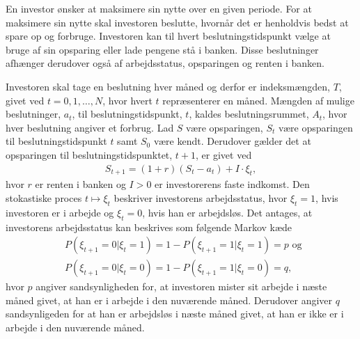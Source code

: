 En investor ønsker at maksimere sin nytte over en given periode. For at maksimere sin nytte skal investoren beslutte, hvornår det er henholdvis bedst at spare op og forbruge. Investoren kan til hvert beslutningstidspunkt vælge at bruge af sin opsparing eller lade pengene stå i banken. Disse beslutninger afhænger derudover også af arbejdsstatus, opsparingen og renten i banken.

Investoren skal tage en beslutning hver måned og derfor er indeksmængden, $T$, givet ved $t = 0,1,\ldots, N$, hvor hvert $t$ repræsenterer en måned. Mængden af mulige beslutninger, $a_t$, til beslutningstidspunkt, $t$, kaldes beslutningsrummet, $A_t$, hvor hver beslutning angiver et forbrug. Lad $S$ være opsparingen, $S_t$ være opsparingen til beslutningstidspunkt $t$ samt $S_0$ være kendt. Derudover gælder det at opsparingen til beslutningstidspunktet, $t+1$, er givet ved
\begin{align*}
    S_{t+1}=(1+r)(S_t-a_t)+I \cdot \xi_t,
\end{align*}
hvor $r$ er renten i banken og $I>0$ er investorerens faste indkomst. Den stokastiske proces $t\mapsto \xi_t$ beskriver investorens arbejdsstatus, hvor $\xi_t=1$, hvis investoren er i arbejde og $\xi_t=0$, hvis han er arbejdsløs. Det antages, at investorens arbejdsstatus kan beskrives som følgende Markov kæde
\begin{align*}
    &P(\xi_{t+1}=0|\xi_t=1)=1-P(\xi_{t+1}=1|\xi_t=1)=p \text{ og }\\
    &P(\xi_{t+1}=0|\xi_t=0)=1-P(\xi_{t+1}=1|\xi_t=0)=q,
\end{align*}
hvor $p$ angiver sandsynligheden for, at investoren mister sit arbejde i næste måned givet, at han er i arbejde i den nuværende måned. Derudover angiver $q$ sandsynligeden for at han er arbejdsløs i næste måned givet, at han er ikke er i arbejde i den nuværende måned. 




